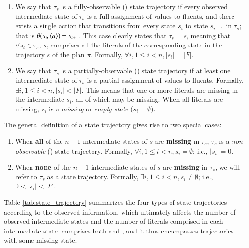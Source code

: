 \begin{enumerate}
\item We say that $\tau_s$ is a fully-observable (\FO) state trajectory if every observed intermediate state of $\tau_s$ is a full assignment of values to fluents, and there exists a single action that transitions from every state $s_i$ to state $s_{i+1}$ in $\tau_s$;  that is $\theta(s_i,{\langle a \rangle})=s_{i+1}$. This case clearly states that $\tau_s = s$, meaning that $\forall s_i \in \tau_s$, $s_i$ comprises all the literals of the corresponding state in the trajectory $s$ of the plan $\pi$. Formally, $\forall i, 1 \leq i  < n, |s_i| = |F|$.
\item We say that $\tau_s$ is a partially-observable (\PO) state trajectory if at least one intermediate state of $\tau_s$ is a partial assignment of values to fluents. Formally, $\exists i, 1 \leq i  < n, |s_i| < |F|$. This means that one or more literals are missing in the intermediate $s_i$, all of which may be missing. When all literals are missing, $s_i$ is a \emph{missing} or \emph{empty state} ($s_i = \emptyset$).
\end{enumerate}

The general definition of a \PO state trajectory gives rise to two special cases:

\begin{enumerate}
\item When \textbf{all} of the $n-1$ intermediate states of $s$ are \textbf{missing} in $\tau_s$, $\tau_s$ is a \emph{non-observable} (\NO) state trajectory. Formally, $\forall i, 1 \leq i < n,  s_i= \emptyset$; i.e., $|s_i| = 0$.
\item When \textbf{none} of the $n-1$ intermediate states of $s$ are \textbf{missing} in $\tau_s$, we will refer to $\tau_s$ as a \POstar state trajectory. Formally, $\exists i, 1 \leq i < n, s_i \neq \emptyset$; i.e., $0 < |s_i| < |F|$.
\end{enumerate}

Table \ref{tab:state_trajectory} summarizes the four types of state trajectories according to the observed information, which ultimately affects the number of observed intermediate states and the number of literals comprised in each intermediate state. \PO comprises both \POstar and \NO, and it thus encompasses trajectories with some missing state.

